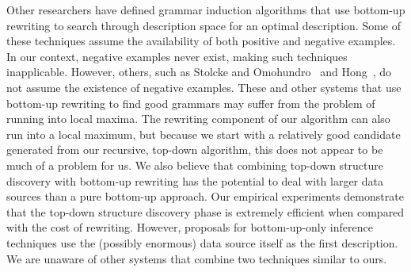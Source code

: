 Other researchers have defined grammar induction algorithms that use
bottom-up rewriting to search through description space for an optimal
description.  Some of these techniques assume the availability of both
positive and negative examples.  In our context, negative examples
never exist, making such techniques inapplicable.
However, others, such as Stolcke and
Omohundro~\cite{stolcke94inducing} and Hong~\cite{hong01using}, do not
assume the existence of negative examples.  These and other systems
that use bottom-up rewriting to find good grammars may suffer from the
problem of running into local maxima.  The rewriting component of our
algorithm can also run into a local maximum, but because we start with
a relatively good candidate generated from our recursive, top-down
algorithm, this does not appear to be much of a problem for us.  We
also believe that combining top-down structure discovery with
bottom-up rewriting has the potential to deal with larger data sources
than a pure bottom-up approach.  Our empirical experiments demonstrate
that the top-down structure discovery phase is extremely efficient
when compared with the cost of rewriting.  However, proposals for
bottom-up-only inference techniques use the (possibly enormous) data
source itself as the first description.  We are unaware of other
systems that combine two techniques similar to ours.
